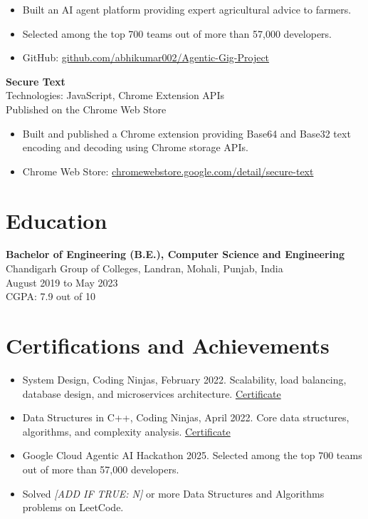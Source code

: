\documentclass[letterpaper,11pt]{article}
\begin{document}
\begin{itemize}
  \item Built an AI agent platform providing expert agricultural advice to farmers.
  \item Selected among the top 700 teams out of more than 57,000 developers.
  \item GitHub: \href{https://github.com/abhikumar002/Agentic-Gig-Project}{github.com/abhikumar002/Agentic-Gig-Project}
\end{itemize}

\vspace{4pt}
\textbf{Secure Text} \\
Technologies: JavaScript, Chrome Extension APIs \\
Published on the Chrome Web Store

\begin{itemize}
  \item Built and published a Chrome extension providing Base64 and Base32 text encoding and
        decoding using Chrome storage APIs.
  \item Chrome Web Store: \href{https://chromewebstore.google.com/detail/secure-text/ankgchfieiimiijhlcjcongijapefmei}{chromewebstore.google.com/detail/secure-text}
\end{itemize}

\section*{Education}

\textbf{Bachelor of Engineering (B.E.), Computer Science and Engineering} \\
Chandigarh Group of Colleges, Landran, Mohali, Punjab, India \\
August 2019 to May 2023 \\
CGPA: 7.9 out of 10

\section*{Certifications and Achievements}

\begin{itemize}
  \item System Design, Coding Ninjas, February 2022. Scalability, load balancing, database
        design, and microservices architecture.
        \href{http://ninjasfiles.s3.amazonaws.com/certificate18894980e4209379ac28665887f78da42bac5c2.pdf}{Certificate}
  \item Data Structures in C++, Coding Ninjas, April 2022. Core data structures, algorithms,
        and complexity analysis.
        \href{https://ninjasfiles.s3.amazonaws.com/certificate19853580c201378561a01f48ae87f59e9220db2.pdf}{Certificate}
  \item Google Cloud Agentic AI Hackathon 2025. Selected among the top 700 teams out of more
        than 57,000 developers.
  \item Solved \textit{[ADD IF TRUE: N]} or more Data Structures and Algorithms problems on LeetCode.
\end{itemize}
\end{document}
